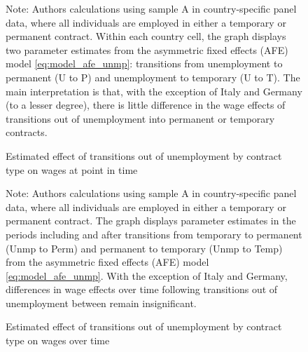 \begin{sidewaysfigure}
    \caption{Estimated effect of transitions out of unemployment by contract type on wages at point in time}
    \label{graph_unmp}
    \footnotesize{Note: Authors calculations using sample A in country-specific panel data, where all individuals are employed in either a temporary or permanent contract.  Within each country cell, the graph displays two parameter estimates from the asymmetric fixed effects (AFE) model \ref{eq:model_afe_unmp}: transitions from unemployment to permanent (U to P) and unemployment to temporary (U to T).  The main interpretation is that, with the exception of Italy and Germany (to a lesser degree), there is little difference in the wage effects of transitions out of unemployment into permanent or temporary contracts.}
\end{sidewaysfigure}

\begin{sidewaysfigure}
    \caption{Estimated effect of transitions out of unemployment by contract type on wages over time}
    \label{graph_unmp_post}
    \footnotesize{Note: Authors calculations using sample A in country-specific panel data, where all individuals are employed in either a temporary or permanent contract.  The graph displays parameter estimates in the periods including and after transitions from temporary to permanent (Unmp to Perm) and permanent to temporary (Unmp to Temp) from the asymmetric fixed effects (AFE) model \ref{eq:model_afe_unmp}.  With the exception of Italy and Germany, differences in wage effects over time following transitions out of unemployment between remain insignificant.}
\end{sidewaysfigure}
